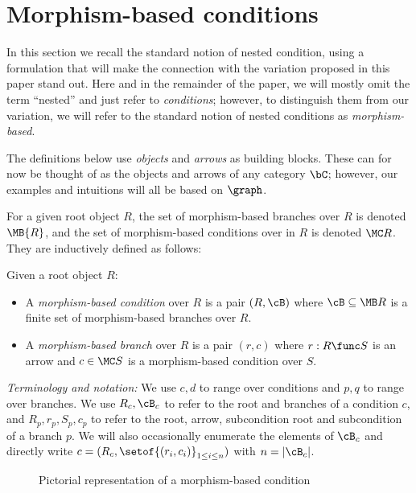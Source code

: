 \section{Morphism-based conditions}
 
In this section we recall the standard notion of nested condition, using a formulation that will make the connection with the variation proposed in this paper stand out. Here and in the remainder of the paper, we will mostly omit the term ``nested'' and just refer to \emph{conditions}; however, to distinguish them from our variation, we will refer to the standard notion of nested conditions as \emph{morphism-based}.

The definitions below use \emph{objects} and \emph{arrows} as building blocks. These can for now be thought of as the objects and arrows of any category $\bC$; however, our examples and intuitions will all be based on $\graph$.

For a given root object $R$, the set of morphism-based branches over $R$ is denoted $\MB{R}$, and the set of morphism-based conditions over in $R$ is denoted $\MC R$. They are inductively defined as follows:

\begin{definition}
  Given a root object $R$:
  \begin{itemize}
  \item A \emph{morphism-based condition} over $R$ is a pair $(R,\cB)$ where $\cB\subseteq \MB R$ is a finite set of morphism-based branches over $R$.
  \item A \emph{morphism-based branch} over $R$ is a pair $(r,c)$ where $r: R\func S$ is an arrow and $c\in \MC S$ is a morphism-based condition over $S$.
  \end{itemize}
\end{definition}
%
\emph{Terminology and notation:} We use $c,d$ to range over conditions and $p,q$ to range over branches. We use $R_c,\cB_c$ to refer to the root and branches of a condition $c$, and $R_p,r_p,S_p,c_p$ to refer to the root, arrow, subcondition root and subcondition of a branch $p$. We will also occasionally enumerate the elements of $\cB_c$ and directly write $c=(R_c, \setof{(r_i, c_i)}_{1\leq i\leq n})$ with $n=|\cB_c|$.
%
\begin{figure}
  \centering
  
  \caption{Pictorial representation of a morphism-based condition}
\end{figure}

